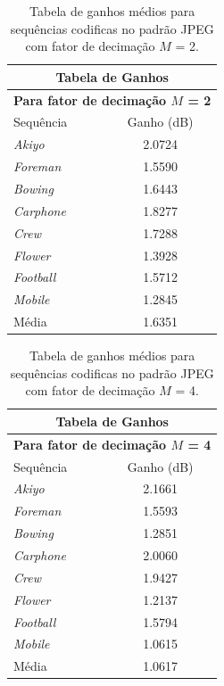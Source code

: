 \begin{table}[hbt]
\centering
\caption{Tabela de ganhos médios para sequências codificas no padrão JPEG com fator de decimação $M$ = 2.}
\label{GanhoJpeg2}
\begin{tabular}{l|c}
\hline
\multicolumn{2}{c}{\textbf{Tabela de Ganhos}}\\
\hline
\hline
\multicolumn{2}{c}{\textbf{Para fator de decimação $M$ = 2}}\\
\hline
\hline			
Sequência	    & Ganho (dB)\\
\hline
\hline
\textit{Akiyo}		&2.0724\\
\hline
\textit{Foreman}		&1.5590\\
\hline
\textit{Bowing}		&1.6443\\
\hline
\textit{Carphone}		&1.8277\\
\hline
\textit{Crew}		&1.7288\\
\hline
\textit{Flower}		&1.3928\\
\hline
\textit{Football}		&1.5712\\
\hline
\textit{Mobile}	&1.2845\\
\hline
\hline
Média		&1.6351\\
\hline
\end{tabular}

\end{table}

\begin{table}[hbt]
\centering
\caption{Tabela de ganhos médios para sequências codificas no padrão JPEG com fator de decimação $M$ = 4.}	
\label{GanhoJpeg4}
\begin{tabular}{l|c}
\hline
\multicolumn{2}{c}{\textbf{Tabela de Ganhos}}\\
\hline
\hline
\multicolumn{2}{c}{\textbf{Para fator de decimação $M$ = 4}}\\
\hline
\hline			
Sequência	    & Ganho (dB)\\
\hline
\hline
\textit{Akiyo}		&2.1661\\
\hline
\textit{Foreman}		&1.5593 \\
\hline
\textit{Bowing}		&1.2851\\
\hline
\textit{Carphone}	& 2.0060\\
\hline
\textit{Crew}		& 1.9427\\
\hline
\textit{Flower}		&1.2137\\
\hline
\textit{Football}		&1.5794\\
\hline
\textit{Mobile}	&1.0615\\
\hline
\hline
Média	&1.0617\\
\hline
\end{tabular}
\end{table}




